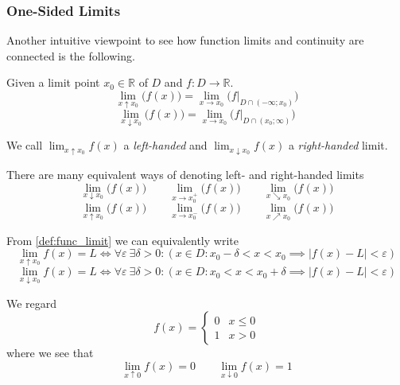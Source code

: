 \subsubsection{One-Sided Limits}
Another intuitive viewpoint to see how function limits and continuity are connected is the following.
\begin{definition}\label{def:one-sided_limit}
   Given a limit point \(x_0 \in \mathbb{R}\) of \(D\) and \(f: D \to \mathbb{R}\).
   \[\lim_{x \uparrow x_0}\big(f(x)\big) = \lim_{x \to x_0}\big(f|_{D \cap (-\infty; x_0)}\big)\]
   \[\lim_{x \downarrow x_0}\big(f(x)\big) = \lim_{x \to x_0}\big(f|_{D \cap (x_0; \infty)}\big)\]
\end{definition}
\begin{remark}[Terminology]
   We call \(\lim_{x \uparrow x_0} f(x)\) a \emph{left-handed} and \(\lim_{x \downarrow x_0} f(x)\) a \emph{right-handed} limit.
\end{remark}
\begin{remark}[Notation]
   There are many equivalent ways of denoting left- and right-handed limits
   \[\lim_{x \downarrow x_0}\big(f(x)\big) \qquad \lim_{x \to x_0^+}\big(f(x)\big) \qquad \lim_{x \searrow x_0}\big(f(x)\big)\]
   \[\lim_{x \uparrow x_0}\big(f(x)\big) \qquad \lim_{x \to x_0^-}\big(f(x)\big) \qquad \lim_{x \nearrow x_0}\big(f(x)\big)\]
\end{remark}
\begin{remark}
   From \cref{def:func_limit} we can equivalently write
   \[\lim_{x \uparrow x_0} f(x) = L \iff \forall \varepsilon~\exists \delta > 0: (x \in D: x_0- \delta < x < x_0 \implies |f(x) - L| < \varepsilon)\]
   \[\lim_{x \downarrow x_0} f(x) = L \iff \forall \varepsilon~\exists \delta > 0: (x \in D: x_0 < x < x_0 + \delta \implies |f(x) - L| < \varepsilon)\]
\end{remark}
\begin{example}
   We regard
   \[f(x) = \begin{cases}0 & x \leq 0\\ 1 & x > 0\end{cases}\]
   where we see that
   \[\lim_{x \uparrow 0} f(x) = 0 \qquad \lim_{x \downarrow 0} f(x) = 1\]
\end{example}
\begin{center}
   
\end{center}

